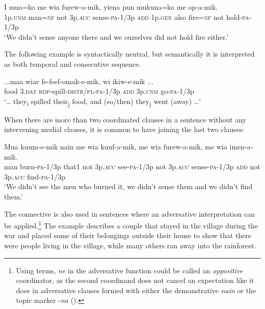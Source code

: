 \ea%
\label{ex:8:x1372}
\gll I  mua=ko  me  wia  furew-a-mik,    yiena  pun  mukuna=ko  me  op-a-mik.\\
1p.\textsc{unm}  man=\textsc{nf}  not  3p.\textsc{acc}  sense-\textsc{pa}-1/3p  \textsc{add}  1p.\textsc{gen}  also fire=\textsc{nf}  not  hold-\textsc{pa}-1/3p    \\
\glt`We didn't sense anyone there and we ourselves did not hold fire either.'
\z


The following example  is syntactically neutral, but semantically it is interpreted as both temporal and consecutive sequence.

\ea%
\label{ex:8:x1373}
\gll ...maa  wiar  fe-feef-omak-e-mik,    wi  ikiw-e-mik ...\\
food  3.\textsc{dat} \textsc{rdp}-spill-\textsc{distr}/\textsc{pl}-\textsc{pa}-1/3p  \textsc{add}  3p.\textsc{unm} go-\textsc{pa}-1/3p   \\
\glt`{\dots} they\textsubscript{i} spilled their\textsubscript{j} food, and (so/then) they\textsubscript{j} went (away) {\dots}'
\z


When there are more than two coordinated clauses in a sentence without any intervening medial clauses, it is common to have   joining the last two clauses:

\ea%
\label{ex:8:x1374}
\gll Mua  kuum-e-mik  nain  me  wia  kuuf-a-mik,  me wia  furew-a-mik,    me  wia  imen-a-mik. \\
man  burn-\textsc{pa}-1/3p  that1  not  3p.\textsc{acc}  see-\textsc{pa}-1/3p  not 3p.\textsc{acc}  sense-\textsc{pa}-1/3p  \textsc{add}  not  3p.\textsc{acc}  find-\textsc{pa}-1/3p     \\
\glt`We didn't see the men who burned it, we didn't sense them and we didn't find them.'
\z


The connective   is also used in sentences where an adversative interpretation can be applied.\footnote{Using  terms, \textit{ne} in the adversative function could be called an \textit{oppositive} coordinator, as the second coordinand does not cancel an expectation like it does in adversative clauses formed with either the demonstrative \textit{nain} or the topic marker -\textit{na} ().}  The example  describes a couple that stayed in the village during the war and placed some of their belongings outside their house to show that there were people living in the village, while many others ran away into the rainforest. 

